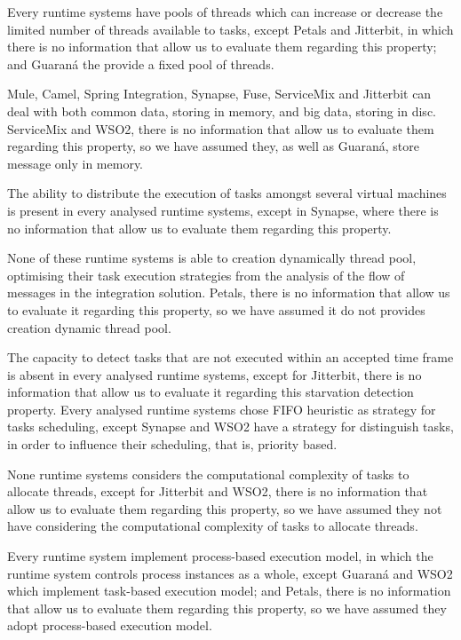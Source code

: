 Every runtime systems have pools of threads which can increase or decrease the limited number of threads available to tasks, except Petals and Jitterbit, in which there is no information that allow us to evaluate them regarding this property; and Guaraná the provide a fixed pool of threads.

Mule, Camel, Spring Integration, Synapse, Fuse, ServiceMix and Jitterbit can deal with both common data, storing in memory, and big data, storing in disc. ServiceMix and WSO2, there is no information that allow us to evaluate them regarding this property, so we have assumed they, as well as Guaraná, store message only in memory.

The ability to distribute the execution of tasks amongst several virtual machines is present in every analysed runtime systems, except in Synapse, where there is no information that allow us to evaluate them regarding this property. 

None of these runtime systems is able to creation dynamically thread pool, optimising their task execution strategies from the analysis of the flow of messages in the integration solution. Petals, there is no information that allow us to evaluate it regarding this property, so we have assumed it do not provides creation dynamic thread pool.

The capacity to detect tasks that are not executed within an accepted time frame is absent in every analysed runtime systems, except for Jitterbit, there is no information that allow us to evaluate it regarding this starvation detection property. Every analysed runtime systems chose FIFO heuristic as strategy for tasks scheduling, except Synapse and WSO2 have a strategy for distinguish tasks, in order to influence their scheduling, that is, priority based. 

None runtime systems considers the computational complexity of tasks to allocate threads, except for Jitterbit and WSO2, there is no information that allow us to evaluate them regarding this property, so we have assumed they not have considering the computational complexity of tasks to allocate threads.

Every runtime system implement process-based execution model, in which the runtime system controls process instances as a whole, except Guaraná and WSO2 which implement task-based execution model; and Petals, there is no information that allow us to evaluate them regarding this property, so we have assumed they adopt process-based execution model. 

